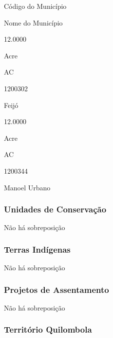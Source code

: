 \documentclass[
  11pt,
  a4paper,
  DIV=11,
  numbers=noendperiod]{scrartcl}
\begin{document}
Código do Município

\n      

Nome do Município

\n    

\n  

\n  

\n    

\n      

12.0000

\n      

Acre

\n      

AC

\n      

1200302

\n      

Feijó

\n    

\n    

\n      

12.0000

\n      

Acre

\n      

AC

\n      

1200344

\n      

Manoel Urbano

\n    

\n  

\n

\subsubsection{Unidades de
Conservação}\label{unidades-de-conservauxe7uxe3o}

Não há sobreposição

\subsubsection{Terras Indígenas}\label{terras-induxedgenas}

Não há sobreposição

\subsubsection{Projetos de Assentamento}\label{projetos-de-assentamento}

Não há sobreposição

\subsubsection{Território Quilombola}\label{territuxf3rio-quilombola}
\end{document}
